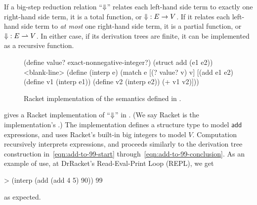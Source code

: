 If a big-step reduction relation ``$\operatorname{\Downarrow}$'' relates each left-hand side term to exactly one right-hand side term, it is a total function, or $\operatorname{\Downarrow} : E \to V$.
If it relates each left-hand side term to \emph{at most} one right-hand side term, it is a partial function, or $\operatorname{\Downarrow} : E \rightharpoonup V$.
In either case, if its derivation trees are finite, it can be implemented as a recursive function.

\begin{figure}[tb]\centering
\begin{schemedisplay}
(define value? exact-nonnegative-integer?)
(struct add (e1 e2))
<blank-line>
(define (interp e)
  (match e
    [(? value? v)  v]
    [(add e1 e2)  (define v1 (interp e1))
                  (define v2 (interp e2))
                  (+ v1 v2)]))
\end{schemedisplay}
\bottomhrule
\caption[Implementation of the big-step semantics]{Racket implementation of the semantics defined in .}
\label{fig:add-language-impl}
\end{figure}

 gives a Racket implementation of ``$\operatorname{\Downarrow}$'' in .
(We say Racket is the implementation's .)
The implementation defines a structure type  to model $\mathsf{add}$ expressions, and uses Racket's built-in big integers to model $V$.
Computation recursively interprets expressions, and proceeds similarly to the derivation tree construction in~\eqref{eqn:add-to-99-start} through~\eqref{eqn:add-to-99-conclusion}.
As an example of use, at DrRacket's Read-Eval-Print Loop (REPL), we get
\begin{center}
\singlespacing
\begin{schemedisplay}
> (interp (add (add 4 5) 90))
99
\end{schemedisplay}
\end{center}
as expected.

